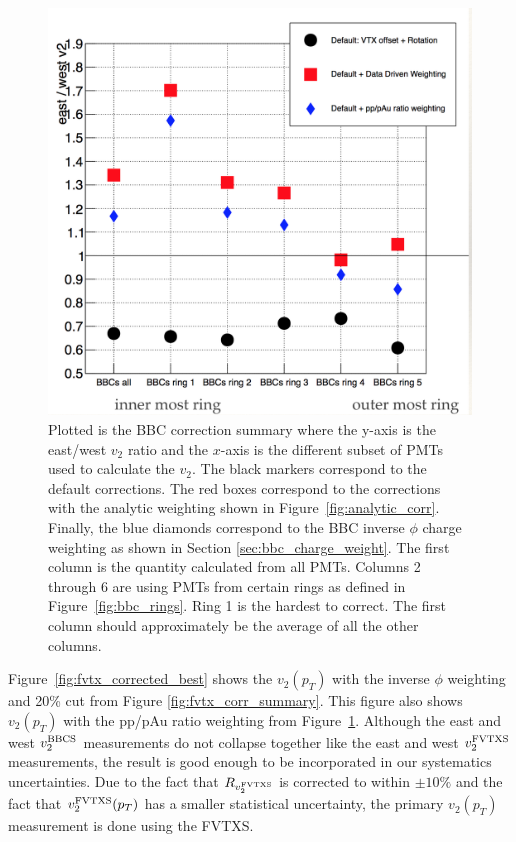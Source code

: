\begin{figure}[!h]
\begin{center}
\includegraphics[width=0.5\linewidth]{figs/bbc_correction_summary.png}
\caption{Plotted is the BBC correction summary where the y-axis is the east/west $v_2$ ratio and the $x$-axis is the different subset of PMTs used to calculate the $v_2$. The black markers correspond to the default corrections. The red boxes correspond to the corrections with the analytic weighting shown in Figure~\ref{fig:analytic_corr}. Finally, the blue diamonds correspond to the BBC inverse $\phi$ charge weighting as shown in Section \ref{sec:bbc_charge_weight}. The first column is the quantity calculated from all PMTs. Columns 2 through 6 are using PMTs from certain rings as defined in Figure~\ref{fig:bbc_rings}. Ring 1 is the hardest to correct. The first column should approximately be the average of all the other columns.}
\label{fig:bbc_corr_summary}
\end{center}
\end{figure}

Figure~\ref{fig:fvtx_corrected_best} shows the $v_2(p_T)$ with the inverse $\phi$ weighting and 20\% cut from Figure \ref{fig:fvtx_corr_summary}. This figure also shows $v_2(p_T)$ with the pp/pAu ratio weighting from Figure~\ref{fig:bbc_corr_summary}. Although the east and west $v_2^{\rm BBCS}$ measurements do not collapse together like the east and west $v_2^{\rm FVTXS}$ measurements, the result is good enough to be incorporated in our systematics uncertainties. Due to the fact that $R_{v_2^{\rm FVTXS}}$ is corrected to within $\pm10\%$ and the fact that $v_2^{\rm FVTXS}(p_T)$ has a smaller statistical uncertainty, the primary $v_2(p_T)$ measurement is done using the FVTXS.

